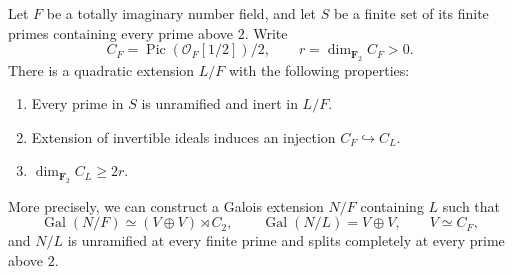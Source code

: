 \begin{lemma}
\label{A:A2-quadratic-step}
Let $F$ be a totally imaginary number field, and let $S$ be a finite
set of its finite primes containing every prime above $2$. Write
\[
 C_F=\operatorname{Pic}(\mathcal O_F[1/2])/2,
 \qquad r=\dim_{\mathbf F_2} C_F>0.
\]
There is a quadratic extension $L/F$ with the following properties:
\begin{enumerate}
 \item Every prime in $S$ is unramified and inert in $L/F$.
 \item Extension of invertible ideals induces an injection
       $C_F\hookrightarrow C_L$.
 \item $\dim_{\mathbf F_2}C_L\ge 2r$.
\end{enumerate}
More precisely, we can construct a Galois extension $N/F$ containing
$L$ such that
\[
 \operatorname{Gal}(N/F)\simeq (V\oplus V)\rtimes C_2,
 \qquad \operatorname{Gal}(N/L)=V\oplus V,
 \qquad V\simeq C_F,
\]
and $N/L$ is unramified at every finite prime and splits completely
at every prime above $2$.
\end{lemma}
